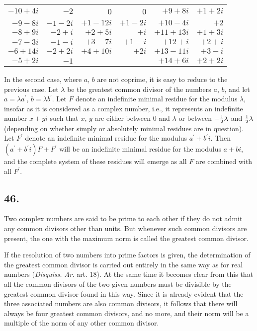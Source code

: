 \documentclass[twoside,12pt]{memoir}
\let\oldfrac\frac
\def\frac#1#2{\mathchoice{\tfrac{#1}{#2}}{\oldfrac{#1}{#2}}{\genfrac{}{}{}{2}{#1}{#2\mathstrut}}{\genfrac{}{}{}{3}{#1}{#2\mathstrut}}}
\begin{document}
\begin{center}
\begin{tabular}{r|r||r|r||r|r}
\(-10+4i\) & \(-2\) & 0 & 0 & \(+9+8i\) & \(+1+2i\) \\
\(-9-8i\) & \(-1-2i\) & \(+1-12i\) & \(+1-2i\) & \(+10-4i\) & \(+2\) \\
\(-8+9i\) & \(-2+i\) & \(+2+5i\) & \(+i\) & \(+11+13i\) & \(+1+3i\) \\
\(-7-3i\) & \(-1-i\) & \(+3-7i\) & \(+1-i\) & \(+12+i\) & \(+2+i\) \\
\(-6+14i\) & \(-2+2i\) & \(+4+10i\) & \(+2i\) & \(+13-11i\) & \(+3-i\) \\
\(-5+2i\) & \(-1\) &\multicolumn{2}{c||}{} & \(+14+6i\) & \(+2+2i\) \\
\end{tabular}
\end{center}
%

In the second case, where \(a\), \(b\) are not coprime, it is easy to reduce to the previous case. Let \(\lambda\) be the greatest common divisor of the numbers \(a\), \(b\), and let \(a=\lambda a^{\prime}\), \(b=\lambda b^{\prime}\). Let \(F\) denote an indefinite minimal residue for the modulus \(\lambda\), insofar as it is considered as a complex number, i.e., it represents an indefinite number \(x+yi\) such that \(x\), \(y\) are either between \(0\) and \(\lambda\) or between \(-\frac{1}{2}\lambda\) and \(\frac{1}{2}\lambda\) (depending on whether simply or absolutely minimal residues are in question). Let \(F^{\prime}\) denote an indefinite minimal residue for the modulus \(a^{\prime}+b^{\prime}i\). Then \((a^{\prime}+b^{\prime}i)F+F^{\prime}\) will be an indefinite minimal residue for the modulus \(a+bi\), and the complete system of these residues will emerge as all \(F\) are combined with all \(F^{\prime}\).
%

\subsection*{46.}

Two complex numbers are said to be prime to each other if they do not admit any common divisors other than units. But whenever such common divisors are present, the one with the maximum norm is called the greatest common divisor.

If the resolution of two numbers into prime factors is given, the determination of the greatest common divisor is carried out entirely in the same way as for real numbers (\textit{Disquiss. Ar.} art. 18). At the same time it becomes clear from this that all the common divisors of the two given numbers must be divisible by the greatest common divisor found in this way.  Since it is already evident that the three associated numbers are also common divisors, it follows that there will always be four greatest common divisors, and no more, and their norm will be a multiple of the norm of any other common divisor.
%
\end{document}
